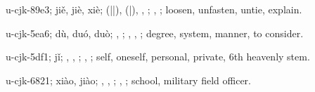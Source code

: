 \begin{multicols}{2}
{\cjkgGlue{}u-cjk-89e3; jiě, jiè, xiè; \cjkgGlue{}\cjkgGlue{}(\cjkgGlue{}|\cjkgGlue{}|\cjkgGlue{}), \cjkgGlue{}\cjkgGlue{}(\cjkgGlue{}|\cjkgGlue{}), \cjkgGlue{}\cjkgGlue{}\cjkgGlue{}, \cjkgGlue{}\cjkgGlue{}\cjkgGlue{}; \cjkgGlue{}, \cjkgGlue{}; loosen, unfasten, untie, explain.

\cjkgGlue{}u-cjk-5ea6; dù, duó, duò; \cjkgGlue{}, \cjkgGlue{}\cjkgGlue{}\cjkgGlue{}; \cjkgGlue{}, \cjkgGlue{}, \cjkgGlue{}; degree, system, manner, to consider.

\cjkgGlue{}u-cjk-5df1; jǐ; \cjkgGlue{}, \cjkgGlue{}, \cjkgGlue{}; \cjkgGlue{}, \cjkgGlue{}; self, oneself, personal, private, 6th heavenly stem.

\cjkgGlue{}u-cjk-6821; xiào, jiào; \cjkgGlue{}, \cjkgGlue{}, \cjkgGlue{}; \cjkgGlue{}, \cjkgGlue{}; school, military field officer.

}
\end{multicols}
